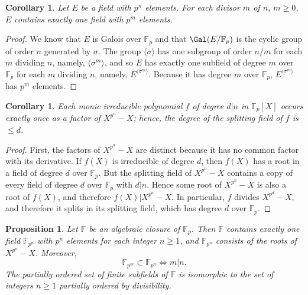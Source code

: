 \documentclass[a4paper,11pt,final,openany]{memoir}
\newtheorem{corollary}[X]{Corollary}
\newtheorem{proposition}[X]{Proposition}
\theoremstyle{nonumberplain}
\newtheorem{proof}{Proof.}
\begin{document}
\begin{corollary}
\label{cg16}Let $E$ be a field with $p^{n}$ elements. For each divisor $m$ of
$n$, $m\geq0$, $E$ contains exactly one field with $p^{m}$ elements.
\end{corollary}

\begin{proof}
We know that $E$ is Galois over $\mathbb{F}_{p}$ and that $\Gal(E/\mathbb{F}%
_{p})$ is the cyclic group of order $n$ generated by $\sigma$. The group
$\langle{}\sigma\rangle$ has one subgroup of order $n/m$ for each $m$ dividing
$n$, namely, $\langle{}\sigma^{m}\rangle$, and so $E$ has exactly one subfield
of degree $m$ over $\mathbb{F}{}_{p}$ for each $m$ dividing $n$, namely,
$E^{\langle\sigma^{m}\rangle}$. Because it has degree $m$ over $\mathbb{F}%
{}_{p}$, $E^{\langle\sigma^{m}\rangle}$ has $p^{m}$ elements.
\end{proof}

\begin{corollary}
\label{cg18}Each monic irreducible polynomial $f$ of degree $d|n$ in
$\mathbb{F}_{p}[X]$ occurs exactly once as a factor of $X^{p^{n}}-X$; hence,
the degree of the splitting field of $f$ is $\leq d$.
\end{corollary}

\begin{proof}
First, the factors of $X^{p^{n}}-X$ are distinct because it has no common
factor with its derivative. If $f(X)$ is irreducible of degree $d$, then
$f(X)$ has a root in a field of degree $d$ over $\mathbb{F}_{p}$. But the
splitting field of $X^{p^{n}}-X$ contains a copy of every field of degree $d$
over $\mathbb{F}_{p}$ with $d|n$. Hence some root of $X^{p^{n}}-X$ is also a
root of $f(X)$, and therefore $f(X)|X^{p^{n}}-X$. In particular, $f$ divides
$X^{p^{d}}-X$, and therefore it splits in its splitting field, which has
degree $d$ over $\mathbb{F}{}_{p}$.
\end{proof}

\begin{proposition}
\label{cg18m}Let $\mathbb{F}$ be an algebraic closure of $\mathbb{F}_{p}$.
Then $\mathbb{F}$ contains exactly one field $\mathbb{F}_{p^{n}}$ with $p^{n}$
elements for each integer $n\geq1$, and $\mathbb{F}{}_{p^{n}}$ consists of the
roots of $X^{p^{n}}-X$. Moreover,
\[
\mathbb{F}_{p^{m}}\subset\mathbb{F}_{p^{n}}\iff m|n.
\]
The partially ordered set of finite subfields of $\mathbb{F}$ is isomorphic to
the set of integers $n\geq1$ partially ordered by divisibility.
\end{proposition}
\end{document}
